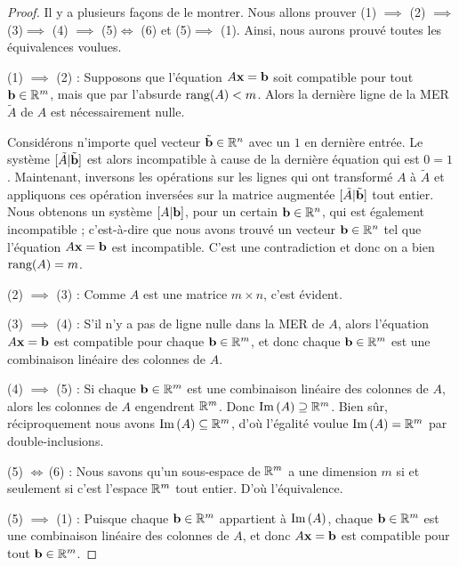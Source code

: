 \begin{proof} Il y a plusieurs façons de le montrer. Nous allons prouver (1) $\implies$ (2) $\implies$ (3)$\implies$ (4) $\implies$ (5)$\iff$ (6) et (5)$\implies$ (1). Ainsi, nous aurons prouvé toutes les équivalences voulues.


(1) $\implies$ (2) : Supposons que l'équation $A\mathbf{x}=\mathbf{b}$ soit compatible pour tout $\mathbf{b}\in \mathbb{R}^m$, mais que par l'absurde $\textrm{rang} (A) <m$. Alors la dernière ligne de la MER $\tilde A$ de $A$ est nécessairement nulle. 

Considérons n'importe quel vecteur $\tilde{\mathbf{b}} \in \mathbb{R}^n$ avec un $1$ en dernière entrée. Le système $[\tilde A | \tilde{\mathbf{b}}]$ est alors incompatible à cause de la dernière équation qui est $0=1$. Maintenant, inversons les opérations sur les lignes qui ont transformé $A$ à $\tilde A$ et appliquons ces opération inversées sur la matrice augmentée $[ \tilde A | \tilde{\mathbf{b}}]$ tout entier. Nous obtenons un système $[ A | \mathbf{b}]$, pour un certain $\mathbf{b}\in \mathbb{R}^n$, qui est également incompatible ; c'est-à-dire que nous avons trouvé un vecteur $\mathbf{b}\in \mathbb{R}^n$ tel que l'équation $A\mathbf{x}=\mathbf{b}$ est incompatible. C'est une contradiction et donc on a bien $\textrm{rang} (A) =m$.

 

(2) $\implies$ (3) : Comme $A$ est une matrice $m \times n$, c'est évident.

(3) $\implies$ (4) : S'il n'y a pas de ligne nulle dans la MER de $A$, alors l'équation $A \mathbf{x}=\mathbf{b}$ est compatible pour chaque $\mathbf{b} \in \mathbb{R}^m$, et donc chaque $\mathbf{b} \in \mathbb{R}^m$ est une combinaison linéaire des colonnes de $A$.


(4) $\implies$ (5) : Si chaque $\mathbf{b} \in \mathbb{R}^m$ est une combinaison linéaire des colonnes de
$A$, alors les colonnes de $A$ engendrent $\mathbb{R}^m$. Donc $\operatorname{Im}\,(A) \supseteq \mathbb{R}^m$.
Bien sûr, réciproquement nous avons $\operatorname{Im}\,(A) \subseteq \mathbb{R}^m$, d'où l'égalité voulue $\operatorname{Im}\,(A) = \mathbb{R}^m$ par double-inclusions.

(5) $\iff \,$(6) :  Nous savons qu'un sous-espace de $\mathbb{R}^m$ a une dimension $m$ si et seulement si c'est l'espace $\mathbb{R}^m$ tout entier. D'où l'équivalence.


(5) $\implies$ (1) :  Puisque chaque $\mathbf{b} \in \mathbb{R}^m$ appartient \`a $\operatorname{Im}\,(A)$, chaque $\mathbf{b} \in \mathbb{R}^m$ est une combinaison linéaire des colonnes de $A$, et donc $A\mathbf{x}=\mathbf{b}$ est compatible pour tout $\mathbf{b} \in \mathbb{R}^m$.
\end{proof}

 


